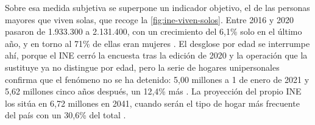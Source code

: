 Sobre esa medida subjetiva se superpone un indicador objetivo, el de las personas mayores que viven solas,
que recoge la \autoref{fig:ine-viven-solos}. Entre 2016 y 2020 pasaron de 1.933.300 a 2.131.400, con un
crecimiento del 6,1\% solo en el último año, y en torno al 71\% de ellas eran mujeres \citep{INEech2020}. El
desglose por edad se interrumpe ahí, porque el INE cerró la encuesta tras la edición de 2020 y la operación
que la sustituye ya no distingue por edad, pero la serie de hogares unipersonales confirma que el fenómeno no
se ha detenido: 5,00 millones a 1 de enero de 2021 y 5,62 millones cinco años después, un 12,4\% más
\citep{INEecp2026}. La proyección del propio INE los sitúa en 6,72 millones en 2041, cuando serán el tipo de
hogar más frecuente del país con un 30,6\% del total \citep{INEproyeccion2026}.

